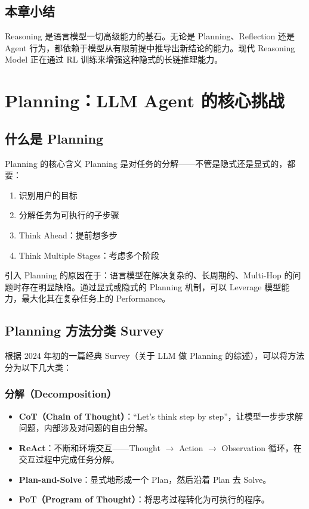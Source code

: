 \documentclass[a4paper]{article}
\begin{document}
\subsection{本章小结}

Reasoning 是语言模型一切高级能力的基石。无论是 Planning、Reflection 还是 Agent 行为，都依赖于模型从有限前提中推导出新结论的能力。现代 Reasoning Model 正在通过 RL 训练来增强这种隐式的长链推理能力。


\section{Planning：LLM Agent 的核心挑战}

\subsection{什么是 Planning}

\begin{importantbox}{Planning 的核心含义}
Planning 是对任务的分解——不管是隐式还是显式的，都要：
\begin{enumerate}
    \item 识别用户的目标
    \item 分解任务为可执行的子步骤
    \item Think Ahead：提前想多步
    \item Think Multiple Stages：考虑多个阶段
\end{enumerate}
\end{importantbox}

引入 Planning 的原因在于：语言模型在解决复杂的、长周期的、Multi-Hop 的问题时存在明显缺陷。通过显式或隐式的 Planning 机制，可以 Leverage 模型能力，最大化其在复杂任务上的 Performance。

\subsection{Planning 方法分类 Survey}

根据 2024 年初的一篇经典 Survey（关于 LLM 做 Planning 的综述），可以将方法分为以下几大类：

\subsubsection{分解（Decomposition）}

\begin{itemize}
    \item \textbf{CoT（Chain of Thought）}：``Let's think step by step''，让模型一步步求解问题，内部涉及对问题的自由分解。
    \item \textbf{ReAct}：不断和环境交互——Thought $\rightarrow$ Action $\rightarrow$ Observation 循环，在交互过程中完成任务分解。
    \item \textbf{Plan-and-Solve}：显式地形成一个 Plan，然后沿着 Plan 去 Solve。
    \item \textbf{PoT（Program of Thought）}：将思考过程转化为可执行的程序。
\end{itemize}
\end{document}
